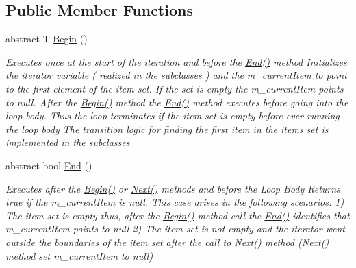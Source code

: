 \subsection*{Public Member Functions}
\begin{DoxyCompactItemize}
\item 
abstract T \hyperlink{class_graph_library_1_1_generics_1_1_abstract_graph_iterator_a2c97c7a412c233b8442b7ad403f29779}{Begin} ()
\begin{DoxyCompactList}\small\item\em Executes once at the start of the iteration and before the \hyperlink{class_graph_library_1_1_generics_1_1_abstract_graph_iterator_aa8cd9f596ec0b6c4c1e9c244ba75df04}{End()} method Initializes the iterator variable ( realized in the subclasses ) and the m\+\_\+current\+Item to point to the first element of the item set. If the set is empty the m\+\_\+current\+Item points to null. After the \hyperlink{class_graph_library_1_1_generics_1_1_abstract_graph_iterator_a2c97c7a412c233b8442b7ad403f29779}{Begin()} method the \hyperlink{class_graph_library_1_1_generics_1_1_abstract_graph_iterator_aa8cd9f596ec0b6c4c1e9c244ba75df04}{End()} method executes before going into the loop body. Thus the loop terminates if the item set is empty before ever running the loop body The transition logic for finding the first item in the items set is implemented in the subclasses \end{DoxyCompactList}\item 
abstract bool \hyperlink{class_graph_library_1_1_generics_1_1_abstract_graph_iterator_aa8cd9f596ec0b6c4c1e9c244ba75df04}{End} ()
\begin{DoxyCompactList}\small\item\em Executes after the \hyperlink{class_graph_library_1_1_generics_1_1_abstract_graph_iterator_a2c97c7a412c233b8442b7ad403f29779}{Begin()} or \hyperlink{class_graph_library_1_1_generics_1_1_abstract_graph_iterator_aac8cffd0d579708a94ba056e4f4a00b2}{Next()} methods and before the Loop Body Returns true if the m\+\_\+current\+Item is null. This case arises in the following scenarios\+: 1) The item set is empty thus, after the \hyperlink{class_graph_library_1_1_generics_1_1_abstract_graph_iterator_a2c97c7a412c233b8442b7ad403f29779}{Begin()} method call the \hyperlink{class_graph_library_1_1_generics_1_1_abstract_graph_iterator_aa8cd9f596ec0b6c4c1e9c244ba75df04}{End()} identifies that m\+\_\+current\+Item points to null 2) The item set is not empty and the iterator went outside the boundaries of the item set after the call to \hyperlink{class_graph_library_1_1_generics_1_1_abstract_graph_iterator_aac8cffd0d579708a94ba056e4f4a00b2}{Next()} method (\hyperlink{class_graph_library_1_1_generics_1_1_abstract_graph_iterator_aac8cffd0d579708a94ba056e4f4a00b2}{Next()} method set m\+\_\+current\+Item to null) \end{DoxyCompactList}\item 

\end{DoxyCompactItemize}
